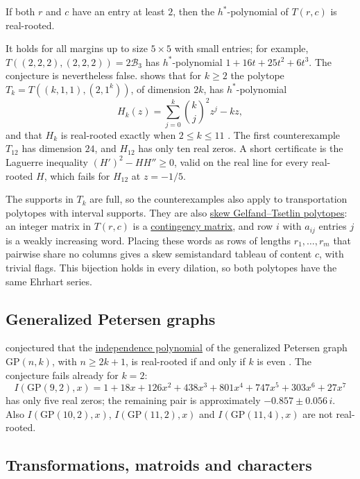 \begin{conjecture}[Alexandersson, 2026]
\label{conjTransportationHStar}
If both $r$ and $c$ have an entry at least $2$, then the
$h^*$-polynomial of $T(r,c)$ is real-rooted.
\end{conjecture}

It holds for all margins up to size $5\times5$ with small entries; for
example, $T((2,2,2),(2,2,2))=2\mathcal{B}_3$ has $h^*$-polynomial
$1+16t+25t^2+6t^3$.  The conjecture is nevertheless false.
 shows that for $k\geq2$ the polytope
$T_k=T((k,1,1),(2,1^k))$, of dimension $2k$, has $h^*$-polynomial
\[
  H_k(z)=\sum_{j=0}^{k}\binom{k}{j}^2z^j-kz,
\]
and that $H_k$ is real-rooted exactly when $2\leq k\leq11$
\cite{Stone2026Transportation}.  The first counterexample $T_{12}$ has
dimension $24$, and $H_{12}$ has only ten real zeros.  A short certificate
is the Laguerre inequality $(H')^2-HH''\geq0$, valid on the real line for
every real-rooted $H$, which fails for $H_{12}$ at $z=-1/5$.

The supports in $T_k$ are full, so the counterexamples also apply to
transportation polytopes with interval supports.  They are also
\hyperref[skewGTPattern]{skew Gelfand--Tsetlin polytopes}: an integer
matrix in $T(r,c)$ is a \hyperref[contingencyMatrices]{contingency matrix},
and row $i$ with $a_{ij}$ entries $j$ is a weakly increasing word.  Placing
these words as rows of lengths $r_1,\dotsc,r_m$ that pairwise share no
columns gives a skew semistandard tableau of content $c$, with trivial
flags.  This bijection holds in every dilation, so both polytopes have the
same Ehrhart series.

\subsection[counterexamplesPetersen]{Generalized Petersen graphs}

 conjectured that the
\hyperref[realRootedIndependence]{independence polynomial} of the
generalized Petersen graph $\mathrm{GP}(n,k)$, with $n\geq2k+1$, is
real-rooted if and only if $k$ is even
\cite[Conj.~4.1]{Pandey2026x}.\label{conjPetersenIndependence}
The conjecture fails already for $k=2$:
\[
  I(\mathrm{GP}(9,2),x)
  =1+18x+126x^2+438x^3+801x^4+747x^5+303x^6+27x^7
\]
has only five real zeros; the remaining pair is approximately
$-0.857\pm0.056\,i$.  Also $I(\mathrm{GP}(10,2),x)$,
$I(\mathrm{GP}(11,2),x)$ and $I(\mathrm{GP}(11,4),x)$ are not real-rooted.

\subsection[counterexamplesTransformations]{Transformations, matroids and characters}

